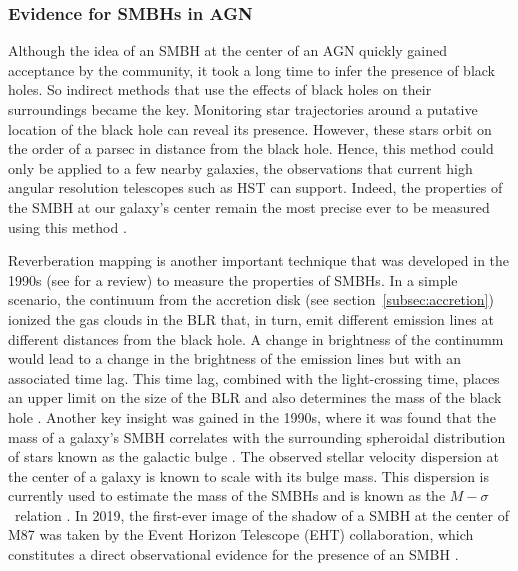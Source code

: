 \subsubsection{Evidence for SMBHs in AGN}
Although the idea of an SMBH at the center of an AGN quickly gained acceptance by the community, it took a long time to infer the presence of black holes. So indirect methods that use the effects of black holes on their surroundings became the key. Monitoring star trajectories around a putative location of the black hole can reveal its presence. However, these stars orbit on the order of a  parsec in distance from the black hole. Hence, this method could only be applied to a few nearby galaxies, the observations that current high angular resolution telescopes such as HST can support. Indeed, the properties of the SMBH at our galaxy's center remain the most precise ever to be measured using this method \citep{2008ApJ...689.1044G}.

Reverberation mapping is another important technique that was developed in the 1990s (see \citet{Peterson2004} for a review) to measure the properties of SMBHs. In a simple scenario, the continuum from the accretion disk (see section~\ref{subsec:accretion}) ionized the gas clouds in the BLR that, in turn, emit different emission lines at different distances from the black hole. A change in brightness of the continumm would lead to a change in the brightness of the emission lines but with an associated time lag. This time lag, combined with the light-crossing time, places an upper limit on the size of the BLR and also determines the mass of the black hole \citep{Peterson2004}. Another key insight was gained in the 1990s, where it was found that the mass of a galaxy's SMBH correlates with the surrounding spheroidal distribution of stars known as the galactic bulge \citep{magorrian1998demography}. The observed stellar velocity dispersion at the center of a galaxy is known to scale with its bulge mass. This dispersion is currently used to estimate the mass of the SMBHs and is known as the $M-\sigma$~relation
\citep{ferrarese2000fundamental,gebhardt2000relationship}. 
In 2019, the first-ever image of the shadow of a SMBH at the center of M87 was taken by the Event Horizon Telescope (EHT) collaboration, which constitutes a direct observational evidence for the presence of an SMBH \citep{collaborat2019first}.
